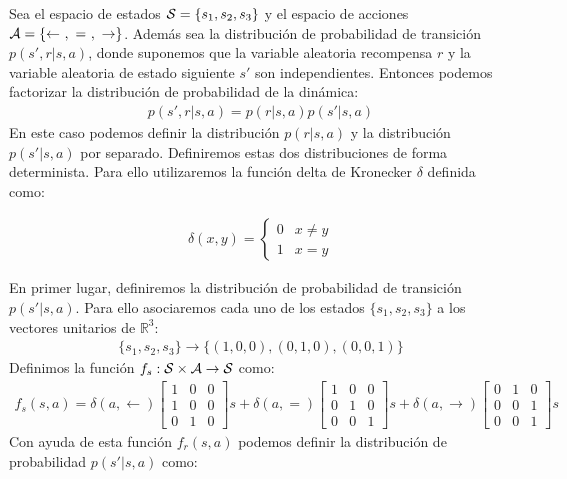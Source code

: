 \begin{example}\label{ControlParticula}

    Sea el espacio de estados $\mathcal{S} = \{ s_1, s_2 ,s_3\}$  y el espacio de acciones $\As = \{\leftarrow \ , \ = \ , \ \rightarrow\}$. 
    Además sea la distribución de probabilidad de transición $p(s',r|s,a)$, donde suponemos que la variable aleatoria recompensa $r$ y la variable aleatoria de estado siguiente $s'$ son independientes. 
    Entonces podemos factorizar la distribución de probabilidad de la dinámica:
    \begin{gather}
        p(s',r|s,a) = p(r|s,a)p(s'|s,a)
    \end{gather}
    En este caso podemos definir la distribución $p(r|s,a)$ y la distribución $p(s'|s,a)$ por separado. Definiremos estas dos distribuciones de forma determinista. Para ello utilizaremos la función delta de Kronecker $\delta$ definida como:
    
    \begin{gather*}
        \delta(x,y) = \begin{cases}
            0 & x \neq y \\
            1 & x  = y
        \end{cases}
    \end{gather*}
    

    En primer lugar, definiremos la distribución de probabilidad de transición $p(s'|s,a)$. Para ello asociaremos cada uno de los estados $\{s_1,s_2,s_3\}$ a los vectores unitarios de $\mathbb{R}^3$: 
    \begin{gather}
        \{s_1,s_2,s_3\} \rightarrow \{(1,0,0),(0,1,0),(0,0,1)\}
    \end{gather}
    Definimos la función $f_s:\mathcal{S} \times \mathcal{A} \rightarrow\mathcal{S}$ como:
    \begin{gather}
        f_s(s,a) = 
        \delta(a,\leftarrow)\begin{bmatrix}
            1 & 0 & 0  \\
            1 & 0 & 0 \\
            0 & 1 & 0
        \end{bmatrix}  s + 
        \delta(a,=)\begin{bmatrix}
            1 & 0 & 0  \\
            0 & 1 & 0 \\
            0 & 0 & 1
    \end{bmatrix}  s + 
    \delta(a,\rightarrow)\begin{bmatrix}
            0 & 1 & 0  \\
            0 & 0 & 1 \\
            0 & 0 & 1
    \end{bmatrix}  s 
    \end{gather}
    Con ayuda de esta función $f_r(s,a)$ podemos definir la distribución de probabilidad $p(s'|s,a)$ como:
    

\end{example}

